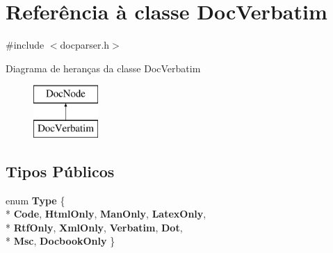 \hypertarget{class_doc_verbatim}{\section{Referência à classe Doc\-Verbatim}
\label{class_doc_verbatim}
}


{\ttfamily \#include $<$docparser.\-h$>$}

Diagrama de heranças da classe Doc\-Verbatim\begin{figure}[H]
\begin{center}
\leavevmode
\includegraphics[height=2.000000cm]{class_doc_verbatim}
\end{center}
\end{figure}
\subsection*{Tipos Públicos}
\begin{DoxyCompactItemize}
\item 
enum {\bfseries Type} \{ \\*
{\bfseries Code}, 
{\bfseries Html\-Only}, 
{\bfseries Man\-Only}, 
{\bfseries Latex\-Only}, 
\\*
{\bfseries Rtf\-Only}, 
{\bfseries Xml\-Only}, 
{\bfseries Verbatim}, 
{\bfseries Dot}, 
\\*
{\bfseries Msc}, 
{\bfseries Docbook\-Only}
 \}
\end{DoxyCompactItemize}
